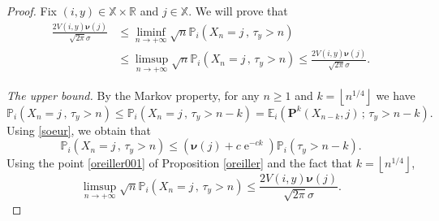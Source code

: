 \documentclass[12pt]{amsart}
\theoremstyle{definition}
\numberwithin{equation}{section}
\newcommand*{\pent}[1]{\left\lfloor#1\right\rfloor}
\def\bb#1{\mathbb{#1}}
\def\bs#1{\boldsymbol{#1}}
\def\bf#1{\mathbf{#1}}
\def\geq{\geqslant}
\def\leq{\leqslant}
\DeclareMathOperator{\e}{e}
\begin{document}
\begin{proof}
Fix $(i,y) \in \bb X \times \bb R$ and $j \in \bb X$. We will prove that 
\begin{align*}
	\frac{2V(i,y) \bs \nu (j)}{\sqrt{2\pi} \sigma}  &\leq \liminf_{n\to+\infty} \sqrt{n} \bb P_i \left( X_n = j  \,,\, \tau_y > n  \right) \\
&\leq \limsup_{n\to+\infty} \sqrt{n} \bb P_i \left( X_n = j  \,,\, \tau_y > n  \right) \leq \frac{2V(i,y) \bs \nu (j)}{\sqrt{2\pi} \sigma}.
\end{align*}

\textit{The upper bound.} By the Markov property, for any $n \geq 1$ and $k=\pent{n^{1/4}}$ we have
\[
\bb P_i \left( X_n = j \,,\, \tau_y > n \right) \leq \bb P_i \left( X_n = j \,,\, \tau_y > n-k \right) = \bb E_i \left( \bf P^k \left( X_{n-k},j \right) \,;\, \tau_y > n-k \right).
\]
Using \eqref{soeur}, we obtain that
\[
\bb P_i \left( X_n = j \,,\, \tau_y > n \right) \leq \left( \bs \nu(j) + c\e^{-ck} \right) \bb P_i \left( \tau_y > n-k \right).
\]
Using the point \ref{oreiller001} of Proposition \ref{oreiller} and the fact that $k=\pent{n^{1/4}}$,
\begin{equation}
	\label{mare}
	\limsup_{n\to +\infty} \sqrt{n} \bb P_i \left( X_n = j \,,\, \tau_y > n \right) \leq \frac{2V(i,y) \bs \nu (j)}{\sqrt{2\pi} \sigma}.
\end{equation}


\end{proof}
\end{document}
